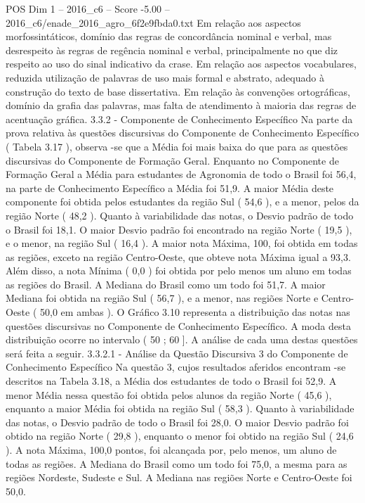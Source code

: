 \begin{textsample}{POS Dim 1 – 2016\_c6 – Score -5.00 – 2016\_c6/enade\_2016\_agro\_6f2e9fbda0.txt}
Em relação aos aspectos morfossintáticos, domínio das regras de concordância nominal e verbal, mas desrespeito às regras de regência nominal e verbal, principalmente no que diz respeito ao uso do sinal indicativo da crase.
Em relação aos aspectos vocabulares, reduzida utilização de palavras de uso mais formal e abstrato, adequado à construção do texto de base dissertativa.
Em relação às convenções ortográficas, domínio da grafia das palavras, mas falta de atendimento à maioria das regras de acentuação gráfica. 3.3.2 - Componente de Conhecimento Específico Na parte da prova relativa às questões discursivas do Componente de Conhecimento Específico ( Tabela 3.17 ), observa -se que a Média foi mais baixa do que para as questões discursivas do Componente de Formação Geral.
Enquanto no Componente de Formação Geral a Média para estudantes de Agronomia de todo o Brasil foi 56,4, na parte de Conhecimento Específico a Média foi 51,9.
A maior Média deste componente foi obtida pelos estudantes da região Sul ( 54,6 ), e a menor, pelos da região Norte ( 48,2 ).
Quanto à variabilidade das notas, o Desvio padrão de todo o Brasil foi 18,1.
O maior Desvio padrão foi encontrado na região Norte ( 19,5 ), e o menor, na região Sul ( 16,4 ).
A maior nota Máxima, 100, foi obtida em todas as regiões, exceto na região Centro-Oeste, que obteve nota Máxima igual a 93,3.
Além disso, a nota Mínima ( 0,0 ) foi obtida por pelo menos um aluno em todas as regiões do Brasil.
A Mediana do Brasil como um todo foi 51,7.
A maior Mediana foi obtida na região Sul ( 56,7 ), e a menor, nas regiões Norte e Centro-Oeste ( 50,0 em ambas ).
O Gráfico 3.10 representa a distribuição das notas nas questões discursivas no Componente de Conhecimento Específico.
A moda desta distribuição ocorre no intervalo ( 50 ; 60 ].
A análise de cada uma destas questões será feita a seguir. 3.3.2.1 - Análise da Questão Discursiva 3 do Componente de Conhecimento Específico Na questão 3, cujos resultados aferidos encontram -se descritos na Tabela 3.18, a Média dos estudantes de todo o Brasil foi 52,9.
A menor Média nessa questão foi obtida pelos alunos da região Norte ( 45,6 ), enquanto a maior Média foi obtida na região Sul ( 58,3 ).
Quanto à variabilidade das notas, o Desvio padrão de todo o Brasil foi 28,0.
O maior Desvio padrão foi obtido na região Norte ( 29,8 ), enquanto o menor foi obtido na região Sul ( 24,6 ).
A nota Máxima, 100,0 pontos, foi alcançada por, pelo menos, um aluno de todas as regiões.
A Mediana do Brasil como um todo foi 75,0, a mesma para as regiões Nordeste, Sudeste e Sul.
A Mediana nas regiões Norte e Centro-Oeste foi 50,0.

\end{textsample}
